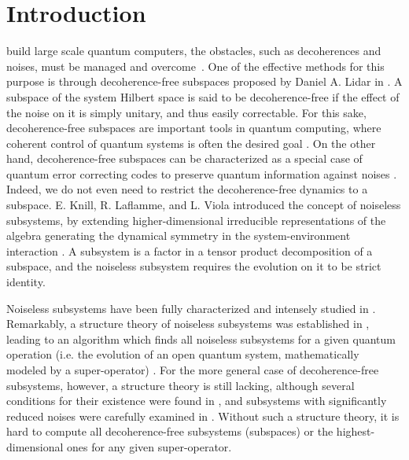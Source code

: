 \documentclass[journal]{IEEEtran}
\begin{document}
 \IEEEpeerreviewmaketitle

\section{Introduction}
 build large scale quantum computers, the obstacles, such as decoherences and noises,  must be managed and overcome~\cite{nielsen2010quantum}. One of the effective methods for this purpose is through
decoherence-free subspaces proposed by Daniel A. Lidar in \cite{lidar1998decoherence}. A subspace of the system Hilbert space is said to be decoherence-free if the effect of the noise on it is simply unitary, and thus easily correctable. For this sake, decoherence-free subspaces are important tools in quantum computing, where coherent control of quantum systems is often the desired goal \cite{lidar2012review}. On the other hand, decoherence-free subspaces  can be characterized as a special case of quantum error correcting codes to preserve quantum information against noises \cite{lidar2012review}. Indeed, we do not even need to restrict the decoherence-free dynamics to a subspace. E. Knill, R. Laflamme, and L. Viola introduced  the concept of noiseless subsystems, by extending higher-dimensional irreducible representations of the algebra generating the dynamical symmetry in the system-environment interaction \cite{knill2000theory}. A subsystem is a factor in a tensor product decomposition of a subspace, and 
the noiseless subsystem requires the evolution on it to be strict identity. 

Noiseless subsystems have been fully characterized and intensely studied in \cite{choi2006method,blume2010information,beny2007generalization,kribs2006quantum,kribs2005unified}. Remarkably, a structure theory of noiseless subsystems  was established in \cite{choi2006method}, leading to an algorithm which finds all noiseless subsystems for a given quantum operation (i.e. the evolution of an open quantum system, mathematically modeled by a super-operator) \cite{knill2006protected,wang2013numerical}. For the more general case of decoherence-free subsystems, however, a structure theory is still lacking, although several conditions for their existence were found in \cite{shabani2005theory}, and subsystems with significantly reduced noises  were carefully examined in \cite{wang2016minimal}. Without such a structure theory, it is hard to compute all decoherence-free subsystems (subspaces) or the highest-dimensional ones for any given super-operator. 
\end{document}
